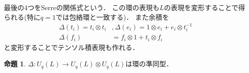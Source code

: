\documentclass[dvipdfmx,autodetect-engine]{article}
\theoremstyle{definition}
\newtheorem{Prop}{命題}
\begin{document}
        最後の4つをSerreの関係式という．
        この環の表現も$L$の表現を変形することで得られる(特に$q = 1$では包絡環と一致する)．
        また余積を
        \begin{align*}
            \Delta\left(t_{i}\right)=t_{i} \otimes t_{i}&, \Delta\left(e_{i}\right)=1 \otimes e_{i}+e_{i} \otimes t_{i}^{-1}\\
            \Delta\left(f_{i}\right)&=f_{i} \otimes 1+t_{i} \otimes f_{i}
        \end{align*}
        と変形することでテンソル積表現も作れる．
        \begin{Prop}
            $\Delta: U_q(L) \to U_q(L) \otimes U_q(L)$は環の準同型．
        \end{Prop}
\end{document}
